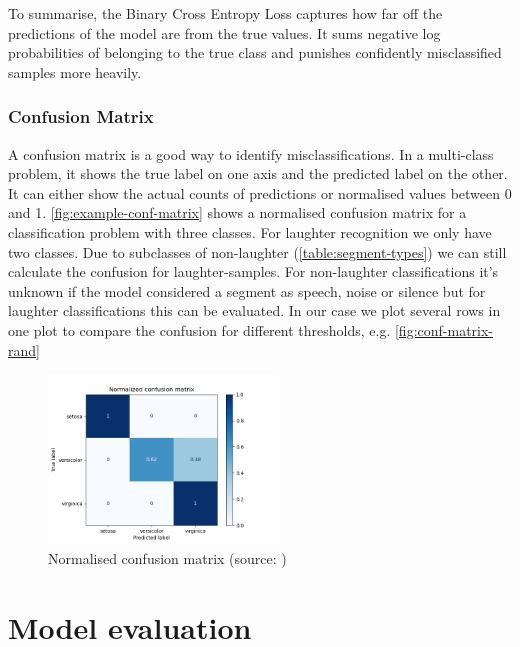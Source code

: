 \documentclass[bsc,frontabs,parskip,deptreport]{infthesis}
\begin{document}
To summarise, the Binary Cross Entropy Loss captures how far off the predictions of the model are from the true values. It sums negative log probabilities of belonging to the true class and punishes confidently misclassified samples more heavily.

\subsection{Confusion Matrix} \label{sec:conf-matrix}
A confusion matrix is a good way to identify misclassifications. In a multi-class problem, it shows the true label on one axis and the predicted label on the other. It can either show the actual counts of predictions or normalised values between 0 and 1. \autoref{fig:example-conf-matrix} shows a normalised confusion matrix for a classification problem with three classes.
For laughter recognition we only have two classes. Due to subclasses of non-laughter (\autoref{table:segment-types}) we can still calculate the confusion for laughter-samples. For non-laughter classifications it's unknown if the model considered a segment as speech, noise or silence but for laughter classifications this can be evaluated. In our case we plot several rows in one plot to compare the confusion for different thresholds, e.g. \autoref{fig:conf-matrix-rand}
\begin{figure}
    \centering
    \includegraphics[width=6cm]{imgs/examples/exmaple_confusion_matrix.png}
    \caption{Normalised confusion matrix (source: \citet{confmatrixscikit})}
    \label{fig:example-conf-matrix}
\end{figure}

\chapter{Model evaluation} \label{cha:model-evaluation}
\end{document}

